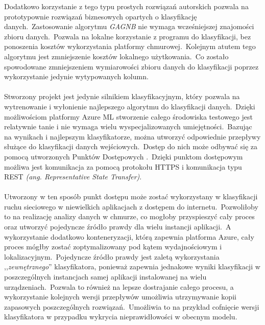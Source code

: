 Dodatkowo korzystanie z tego typu prostych rozwiązań autorskich pozwala na prototypownie rozwiązań biznesowych opartych o klasyfikację danych.\ Zastosowanie algorytmu \textit{GAGNB} nie wymaga wcześniejszej znajomości zbioru danych.\ Pozwala na lokalne korzystanie z programu do klasyfikacji, bez ponoszenia kosztów wykorzystania platformy chmurowej.\ Kolejnym atutem tego algorytmu jest zmniejszenie kosztów lokalnego użytkowania.\ Co zostało spowodowane zmniejszeniem wymiarowości zbioru danych do klasyfikacji poprzez wykorzystanie jedynie wytypowanych kolumn.
\\ \\
Stworzony projekt jest jedynie silnikiem klasyfikacyjnym, który pozwala na wytrenowanie i wyłonienie najlepszego algorytmu do klasyfikacji danych.\ Dzięki możliwościom platformy Azure ML stworzenie całego środowiska testowego jest relatywnie tanie i nie wymaga wielu wyspecjalizowanych umiejętności.\ Bazując na wynikach i najlepszym klasyfikatorze, można utworzyć odpowiednie przepływy służące do klasyfikacji danych wejściowych.\ Dostęp do nich może odbywać się za pomocą utworzonych Punktów Dostępowych .\ Dzięki punktom dostępowym możliwa jest komunikacja za pomocą protokołu HTTPS  i komunikacja typu REST \textit{(ang. Representative State Transfer)}.
\\ \\
Utworzony w ten sposób punkt dostępu może zostać wykorzystany w klasyfikacji ruchu sieciowego w niewielkich aplikacjach z dostępem do internetu.\ Pozwoliłoby to na realizację analizy danych w chmurze, co mogłoby przyspieszyć cały proces oraz utworzyć pojedyncze źródło prawdy dla wielu instancji aplikacji.\ A wykorzystanie dodatkowo konteneryzacji, którą zapewnia platforma Azure, cały proces mógłby zostać zoptymalizowany pod kątem wydajnościowym i lokalizacyjnym.\ Pojedyncze źródło prawdy jest zaletą wykorzystania ,,\textit{zewnętrznego}'' klasyfikatora, ponieważ zapewnia jednakowe wyniki klasyfikacji w poszczególnych instancjach samej aplikacji instalowanej na wielu urządzeniach.\ Pozwala to również na lepsze dostrajanie całego procesu, a wykorzystanie kolejnych wersji przepływów umożliwia utrzymywanie kopii zapasowych poszczególnych rozwiązań.\ Umożliwia to na przykład cofnięcie wersji klasyfikatora w przypadku wykrycia nieprawidłowości w obecnym modelu.
